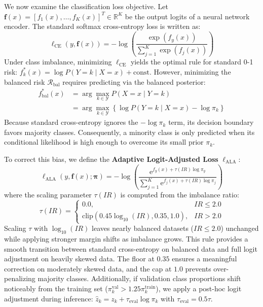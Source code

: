 \documentclass[10pt,journal,compsoc]{IEEEtran}
\begin{document}
We now examine the classification loss objective. Let $\mathbf{f}(x) = [f_1(x), \dots, f_K(x)]^T \in \mathbb{R}^K$ be the output logits of a neural network encoder. The standard softmax cross-entropy loss is written as:
\begin{equation}
    \ell_{\text{CE}}(y, \mathbf{f}(x)) = -\log \left( \frac{\exp(f_y(x))}{\sum_{j=1}^K \exp(f_j(x))} \right)
\end{equation}
Under class imbalance, minimizing $\ell_{\text{CE}}$ yields the optimal rule for standard 0-1 risk: $f_k^*(x) = \log P(Y=k \mid X=x) + \text{const}$. However, minimizing the balanced risk $\mathcal{R}_{\text{bal}}$ requires predicting via the balanced posterior:
\begin{align}
    f_{\text{bal}}^*(x) &= \arg\max_{k \in \mathcal{Y}} P(X=x \mid Y=k) \nonumber \\
    &= \arg\max_{k \in \mathcal{Y}} \left\{ \log P(Y=k \mid X=x) - \log \pi_k \right\}
\end{align}
Because standard cross-entropy ignores the $-\log \pi_k$ term, its decision boundary favors majority classes. Consequently, a minority class is only predicted when its conditional likelihood is high enough to overcome its small prior $\pi_k$.

To correct this bias, we define the \textbf{Adaptive Logit-Adjusted Loss} $\ell_{\text{ALA}}$:
\begin{equation}
    \ell_{\text{ALA}}(y, \mathbf{f}(x); \boldsymbol{\pi}) = -\log \left( \frac{\mathrm{e}^{f_y(x) + \tau(IR) \log \pi_y}}{\sum_{j=1}^K \mathrm{e}^{f_j(x) + \tau(IR) \log \pi_j}} \right)
\end{equation}
where the scaling parameter $\tau(IR)$ is computed from the imbalance ratio:
\begin{equation}
    \tau(IR) = \begin{cases}
        0.0, & IR \le 2.0 \\
        \mathrm{clip}\left(0.45 \log_{10}(IR), 0.35, 1.0\right), & IR > 2.0
    \end{cases}
\end{equation}
Scaling $\tau$ with $\log_{10}(IR)$ leaves nearly balanced datasets ($IR \le 2.0$) unchanged while applying stronger margin shifts as imbalance grows. This rule provides a smooth transition between standard cross-entropy on balanced data and full logit adjustment on heavily skewed data. The floor at $0.35$ ensures a meaningful correction on moderately skewed data, and the cap at $1.0$ prevents over-penalizing majority classes. Additionally, if validation class proportions shift noticeably from the training set ($\pi_k^{\text{val}} > 1.25 \pi_k^{\text{train}}$), we apply a post-hoc logit adjustment during inference: $\hat{z}_k = z_k + \tau_{\text{eval}} \log \pi_k$ with $\tau_{\text{eval}} = 0.5 \tau$.
\end{document}
